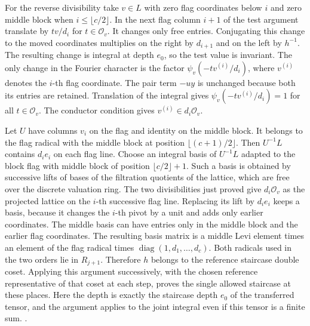 For the reverse divisibility take \(v\in L\) with
zero flag coordinates below \(i\) and zero middle block
when \(i\le \lfloor c/2\rfloor\). In the next flag column
\(i+1\) of the test argument translate by \(t v/d_i\)
for \(t\in\mathcal O_v\). It changes only free entries.
Conjugating this change to the moved coordinates multiplies
on the right by \(d_{i+1}\) and on the left by \(h^{-1}\).
The resulting change is integral at depth \(e_0\), so the
test value is invariant. The only change in the Fourier
character is the factor \(\psi_v(-t v^{(i)}/d_i)\), where
\(v^{(i)}\) denotes the \(i\)-th flag coordinate.
The pair term \(-u y\) is unchanged because both its
entries are retained. Translation of the integral gives
\(\psi_v(-t v^{(i)}/d_i)=1\) for all \(t\in\mathcal O_v\).
The conductor condition gives \(v^{(i)}\in d_i\mathcal O_v\).

Let \(U\) have columns \(v_i\) on the flag and identity on
the middle block. It belongs to the flag radical with the
middle block at position \(\lfloor(c+1)/2\rfloor\).
Then \(U^{-1}L\) contains \(d_i e_i\) on each flag line.
Choose an integral basis of \(U^{-1}L\) adapted to the block
flag with middle block of position \(\lfloor c/2\rfloor+1\).
Such a basis is obtained by successive lifts of bases of
the filtration quotients of the lattice, which are free over
the discrete valuation ring. The two divisibilities just
proved give \(d_i\mathcal O_v\) as the projected lattice on
the \(i\)-th successive flag line. Replacing its lift by
\(d_i e_i\) keeps a basis, because it changes the \(i\)-th
pivot by a unit and adds only earlier coordinates.
The middle basis can have entries only in the middle block
and the earlier flag coordinates. The resulting basis matrix
is a middle Levi element times an element of the flag
radical times \(\operatorname{diag}(1,d_1,\ldots,d_c)\).
Both radicals used in the two orders lie in \(R_{j+1}\).
Therefore \(h\) belongs to the reference staircase double
coset. Applying this argument successively, with the chosen
reference representative of that coset at each step, proves
the single allowed staircase at these places. Here the
depth is exactly the staircase depth \(e_0\) of the
transferred tensor, and the argument applies to the joint
integral even if this tensor is a finite sum.
.

